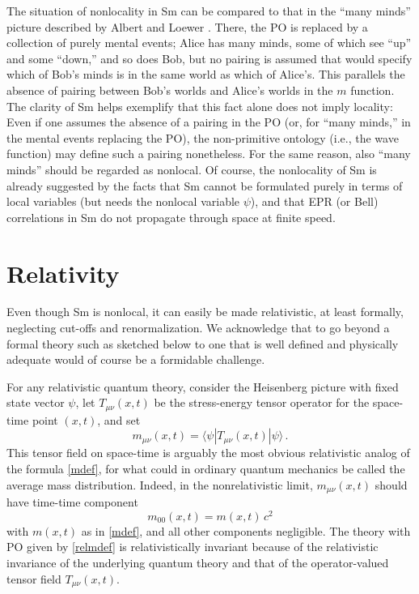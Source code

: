 \documentclass[12pt]{article}
\newcommand{\scp}[2]{\langle #1|#2 \rangle}
\newcommand{\z}[1]{{#1}}
\begin{document}
The situation of nonlocality in Sm can be compared to that in the ``many minds'' picture described by Albert and Loewer \cite{AL88}. There, the PO is replaced by a collection of purely mental events; Alice has many minds, some of which see ``up'' and some ``down,'' and so does Bob, but no pairing is assumed that would specify which of Bob's minds is in the same world as which of Alice's. This parallels the absence of pairing between Bob's worlds and Alice's worlds in the $m$ function. The clarity of Sm helps exemplify that this fact alone does not imply locality: Even if one assumes the absence of a pairing in the PO (or, for ``many minds,'' in the mental events replacing the PO), the non-primitive ontology (i.e., the wave function) may define such a pairing nonetheless. For the same reason, also ``many minds'' should be regarded as nonlocal. Of course, the nonlocality of Sm is already suggested by the facts that Sm cannot be formulated purely in terms of local variables (but needs the nonlocal variable $\psi$), and that EPR (or Bell) correlations in Sm do not propagate through space at finite speed.



\section{Relativity}\label{sec:relativity}

Even though Sm is nonlocal, it can easily be made relativistic, \z{at least formally, neglecting cut-offs and renormalization. We acknowledge  that  to go beyond  a formal theory such as sketched below to one that is well defined and physically adequate would of course be a formidable challenge.} 

For any relativistic quantum theory, consider the Heisenberg picture with fixed state vector $\psi$, let $T_{\mu\nu}(x,t)$ be the stress-energy tensor operator for the space-time point $(x,t)$, and set
\begin{equation}\label{relmdef}
m_{\mu\nu}(x,t) = \scp{\psi}{T_{\mu\nu}(x,t)|\psi}\,.
\end{equation}
This tensor field on space-time is arguably the most obvious relativistic analog of the formula \eqref{mdef}, for what could in ordinary quantum mechanics be called the average mass distribution. Indeed, in the nonrelativistic limit, $m_{\mu\nu}(x,t)$ should have time-time component
\begin{equation}
m_{00}(x,t)=m(x,t) \, c^2
\end{equation}
with $m(x,t)$ as in \eqref{mdef}, and all other components negligible. The theory with PO given by \eqref{relmdef} is relativistically invariant because of the relativistic invariance of the underlying quantum theory and that of the operator-valued tensor field $T_{\mu\nu}(x,t)$.
\end{document}
